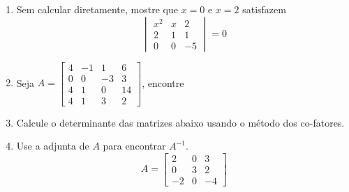 \documentclass[a4paper,5pt]{amsbook}
\begin{document}
\begin{enumerate}
	\vspace{0.5cm}
	\item Sem calcular diretamente, mostre que $x=0$ e $x=2$ satisfazem
		\[\begin{vmatrix}
			x^2 & x & 2 \\
			2 & 1 & 1 \\
			0 & 0 & -5
		\end{vmatrix}=0\]

	\item Seja $A = \begin{bmatrix}
				4 & -1 & 1 & 6 \\
				0 & 0 & -3 & 3 \\
				4 & 1 & 0 & 14 \\
				4 & 1 & 3 & 2
			\end{bmatrix}$,
		encontre

		\vspace{0.3cm}

	\vspace{0.5cm}
	\item Calcule o determinante das matrizes abaixo usando o m\'etodo dos
		co-fatores.


	\vspace{0.5cm}
	\item Use a adjunta de $A$ para encontrar $A^{-1}$.
		\[A = \begin{bmatrix}
				2 & 0 & 3 \\
				0 & 3 & 2 \\
				-2 & 0 & -4
			\end{bmatrix}\]
\end{enumerate}
\end{document}
